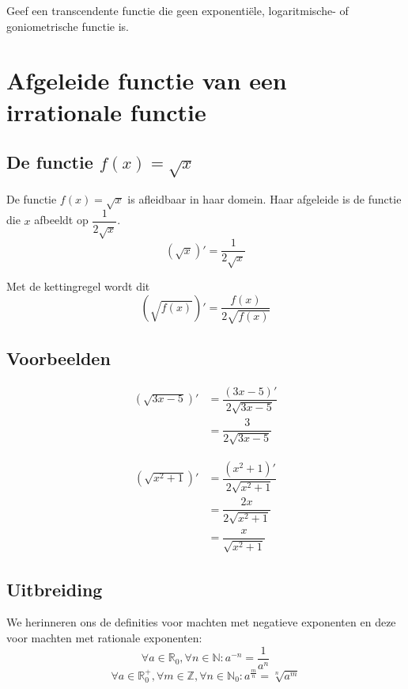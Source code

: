 \documentclass[12pt,twoside,a4paper]{article}
\begin{document}
\begin{oefening}
Geef een transcendente functie die geen exponentiële, logaritmische- of goniometrische functie is.
\end{oefening}

\cleardoublepage
\section{Afgeleide functie van een irrationale functie}

\subsection{De functie $f(x)=\sqrt{x}$}

De functie $f(x)=\sqrt{x}$ is afleidbaar in haar domein. Haar afgeleide is de functie die $x$ afbeeldt op $\dfrac{1}{2\sqrt{x}}$.
$$\left(\sqrt{x}\right)'=\dfrac{1}{2\sqrt{x}}$$

Met de kettingregel wordt dit
$$\left(\sqrt{f(x)}\right)'=\dfrac{f(x)}{2\sqrt{f(x)}}$$

\subsection{Voorbeelden}
\begin{minipage}{0.5\textwidth}
\begin{align*}
\left(\sqrt{3x-5}\right)' &= \dfrac{(3x-5)'}{2\sqrt{3x-5}}\\
                          &= \dfrac{3}{2\sqrt{3x-5}}
\end{align*}
\end{minipage}
\begin{minipage}{0.5\textwidth}
\begin{align*}
\left(\sqrt{x^2+1}\right)' &= \dfrac{(x^2+1)'}{2\sqrt{x^2+1}}\\
                           &= \dfrac{2x}{2\sqrt{x^2+1}}\\
                           &= \dfrac{x}{\sqrt{x^2+1}}
\end{align*}
\end{minipage}

\subsection{Uitbreiding}
We herinneren ons de definities voor machten met negatieve exponenten en deze voor machten met rationale exponenten:
$$\forall a\in\mathbb{R}_0, \forall n\in\mathbb{N} : a^{-n}=\dfrac{1}{a^n}$$
$$\forall a\in\mathbb{R}_0^+, \forall m\in\mathbb{Z}, \forall n\in\mathbb{N}_0 : a^{\frac{m}{n}}=\sqrt[n]{a^m}$$
\end{document}
